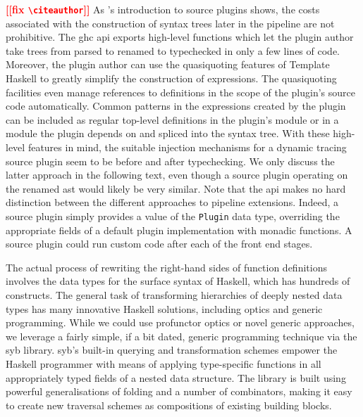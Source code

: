 \documentclass[thesis=B,english]{FITthesis}[2019/12/23]
\newcommand{\todo}[1]{\textcolor{red}{\textbf{[[#1]]}}}
\newcommand{\hsType}[1]{\texttt{#1}}
\begin{document}
\todo{fix \texttt{\textbackslash citeauthor}}
As \citeauthor{blog-source-plugins}'s introduction to source plugins shows, the
costs associated with the construction of syntax trees later in the pipeline
are not prohibitive\cite{blog-source-plugins}. The \acrshort{ghc}
\acrshort{api} exports high-level functions which let the plugin author take
trees from parsed to renamed to typechecked in only a few lines of code.
Moreover, the plugin author can use the quasi\-quoting
features\cite{th-quasiquoting} of Template Haskell\cite{th-classic} to greatly
simplify the construction of expressions. The quasi\-quoting facilities even
manage references to definitions in the scope of the plugin's source code
automatically. Common patterns in the expressions created by the plugin can be
included as regular top-level definitions in the plugin's module or in a module
the plugin depends on and spliced into the syntax tree. With these high-level
features in mind, the suitable injection mechanisms for a dynamic tracing
source plugin seem to be before and after typechecking. We only discuss the
latter approach in the following text, even though a source plugin operating on
the renamed \acrshort{ast} would likely be very similar. Note that the
\acrshort{api} makes no hard distinction between the different approaches to
pipeline extensions. Indeed, a source plugin simply provides a value of the
\hsType{Plugin} data type, overriding the appropriate fields of a default
plugin implementation with monadic functions. A source plugin could run custom
code after each of the front end stages.

The actual process of rewriting the right-hand sides of function definitions
involves the data types for the surface syntax of Haskell, which has hundreds
of constructs\cite[Key~Design~Choices]{arch-ghc}. The general task of
transforming hierarchies of deeply nested data types has many innovative
Haskell solutions, including optics and generic programming. While we could use
pro\-functor optics or novel generic approaches, we leverage a fairly simple,
if a bit dated, generic programming technique via the \acrfull{syb}
library\cite{syb-paper}. \acrshort{syb}'s built-in querying and transformation
schemes empower the Haskell programmer with means of applying type-specific
functions in all appropriately typed fields of a nested data structure. The
library is built using powerful generalisations of folding and a number of
combinators, making it easy to create new traversal schemes as compositions of
existing building blocks.
\end{document}
